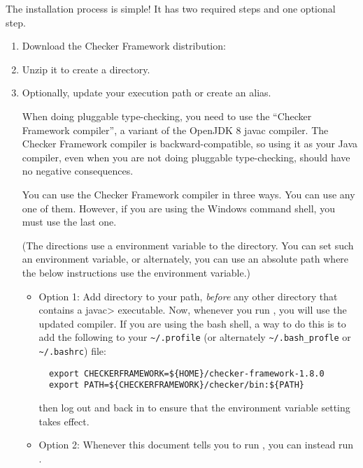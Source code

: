 The installation process is simple!  It has two required steps and one
optional step.
\begin{enumerate}
\item
  Download the Checker Framework distribution:
  \\
\item 
  Unzip it to create a  directory.


\item
  Optionally, update your execution path or create an alias.

  When doing pluggable type-checking, you need to use the ``Checker
  Framework compiler'', a variant of the OpenJDK 8 javac
  compiler.  The Checker Framework
  compiler is backward-compatible, so using it as your Java compiler, even
  when you are not doing pluggable type-checking, should have no negative
  consequences.

  You can use the Checker Framework compiler in three ways.  You can use any one of them.  However, if
  you are using the Windows command shell, you must use the last one.

  (The directions use a  environment variable to the
   directory.  You can set such an environment
  variable, or alternately, you can
  use an absolute path where the below instructions use the 
  environment variable.)


  \begin{itemize}
  \item
    Option 1:
    Add directory
     to your path, \emph{before} any other
    directory that contains a \<javac> executable.  Now, whenever
    you run , you will use the updated compiler.  If you are
    using the bash shell, a way to do this is to add the following to your
    \verb|~/.profile| (or alternately \verb|~/.bash_profle| or \verb|~/.bashrc|) file:
\begin{Verbatim}
  export CHECKERFRAMEWORK=${HOME}/checker-framework-1.8.0
  export PATH=${CHECKERFRAMEWORK}/checker/bin:${PATH}
\end{Verbatim}
    then log out and back in to ensure that the environment variable
    setting takes effect.
  \item
    Option 2:
    Whenever this document tells you to run , you
    can instead run .


\end{itemize}
\end{enumerate}
